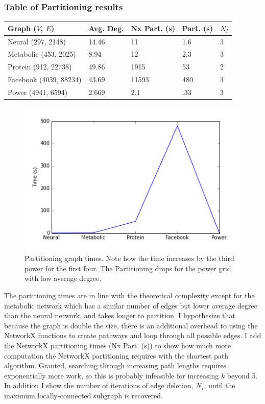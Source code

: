 \documentclass{article}
\begin{document}
\subsubsection{Table of Partitioning results} 
\begin{spacing}{1}
\begin{center}
\renewcommand{\arraystretch}{1.5}
    \begin{tabular}{| l | l | l | l | l |}
    \hline
    Graph ($V$, $E$) & Avg. Deg. & Nx Part. (s) & Part. (s) & $N_I$ \\ \hline
    Neural (297, 2148) & 14.46 & 11 & 1.6 & 3 \\ \hline
    Metabolic (453, 2025) & 8.94 & 12 & 2.3 & 3 \\  \hline
    Protein (912, 22738) & 49.86 & 1915 & 53 & 2 \\ \hline
    Facebook (4039, 88234) & 43.69 & 11593 & 480 & 3 \\ \hline
    Power (4941, 6594) & 2.669 & 2.1 & .33 & 3 \\ 
    \hline
    \end{tabular}
\end{center}
\end{spacing}

\begin{figure}
\centering
\includegraphics[width = \linewidth]{ptimes.png}
\caption{Partitioning graph times. Note how the time increases by the third power for the first four. The Partitioning drops for the power grid with low average degree.}
\end{figure}

The partitioning times are in line with the theoretical complexity except for the metabolic network which has a similar number of edges but lower average degree than the neural network, and takes longer to partition. I hypothesize that because the graph is double the size, there is an additional overhead to using the NetworkX functions to create pathways and loop through all possible edges. I add the NetworkX partitioning times (Nx Part. (s)) to show how much more computation the NetworkX partitioning requires with the shortest path algorithm. Granted, searching through increasing path lengths requires exponentially more work, so this is probably infeasible for increasing $k$ beyond 5. In addition I show the number of iterations of edge deletion, $N_I$, until the maximum locally-connected subgraph is recovered.
\end{document}
